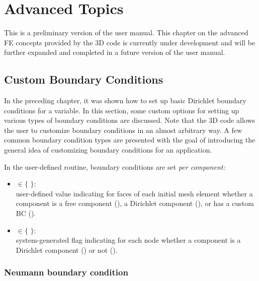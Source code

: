 %
%

\chapter{Advanced Topics}
\label{chap:advanced}


This is a preliminary version of the user manual. This chapter on the advanced FE concepts provided by the \hp3D code is currently under development and will be further expanded and completed in a future version of the user manual.

\section{Custom Boundary Conditions}
\label{sec:advanced-BC}

In the preceding chapter, it was shown how to set up basic Dirichlet boundary conditions for a variable. In this section, some custom options for setting up various types of boundary conditions are discussed. Note that the \hp3D code allows the user to customize boundary conditions in an almost arbitrary way. A few common boundary condition types are presented with the goal of introducing the general idea of customizing boundary conditions for an application.

In the user-defined  routine, boundary conditions are set \emph{per component:}
\begin{itemize}
	\item{
	 $\in \{$  $\}$:\\
	user-defined value indicating for faces of each initial mesh element  whether a component is a free component (), a Dirichlet component (), or has a custom BC ().
	} \item{
	 $\in \{$  $\}$:\\
	system-generated flag indicating for each node  whether a component is a Dirichlet component () or not ().
	}
\end{itemize}

\subsection{Neumann boundary condition}
\label{sec:impedance}

